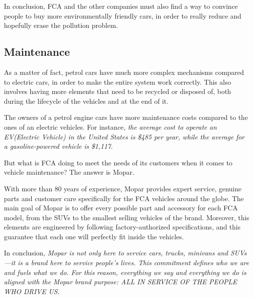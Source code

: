 In conclusion, FCA and the other companies must also find a way to convince people to buy more environmentally friendly cars, in order to really reduce and hopefully erase the pollution problem.

\subsection{Maintenance}

As a matter of fact, petrol cars have much more complex mechanisms compared to electric cars, in order to make the entire system work correctly. This also involves having more elements that need to be recycled or disposed of, both during the lifecycle of the vehicles and at the end of it.

The owners of a petrol engine cars have more maintenance costs compared to the ones of an electric vehicles. For instance, \emph{the average cost to operate an EV(Electric Vehicle) in the United States is \$485 per year, while the average for a gasoline-powered vehicle is \$1,117}\cite{maintenance_costs}. 

But what is FCA doing to meet the needs of its customers when it comes to vehicle maintenance? The answer is Mopar. 

With more than 80 years of experience, Mopar provides expert service, genuine parts and customer care specifically for the FCA vehicles around the globe\cite{maintenance_mopar}. 
The main goal of Mopar is to offer every possible part and accessory for each FCA model, from the SUVs to the smallest selling vehicles of the brand. Moreover, this elements are engineered by following factory-authorized specifications, and this guarantee that each one will perfectly fit inside the vehicles\cite{maintenance_mopar}.

In conclusion, \emph{Mopar is not only here to service cars, trucks, minivans and SUVs—it is a brand here to service people’s lives. This commitment defines who we are and fuels what we do. For this reason, everything we say and everything we do is aligned with the Mopar brand purpose:
ALL IN SERVICE OF THE PEOPLE WHO DRIVE US.}\cite{maintenance_mopar}